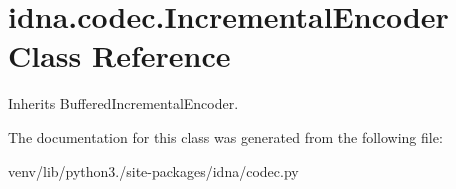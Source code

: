 \hypertarget{classidna_1_1codec_1_1_incremental_encoder}{}\section{idna.\+codec.\+Incremental\+Encoder Class Reference}
\label{classidna_1_1codec_1_1_incremental_encoder}


Inherits Buffered\+Incremental\+Encoder.



The documentation for this class was generated from the following file\+:\begin{DoxyCompactItemize}
\item 
venv/lib/python3./site-\/packages/idna/codec.\+py\end{DoxyCompactItemize}
